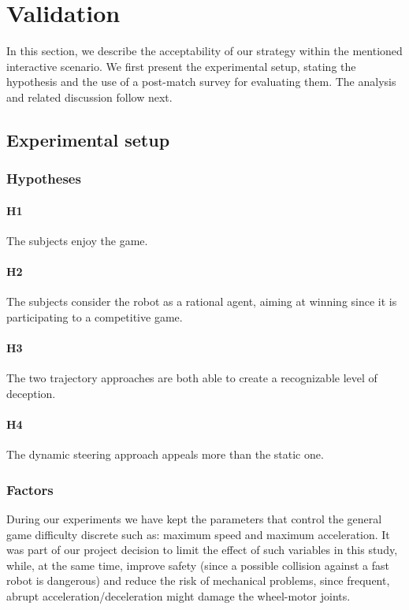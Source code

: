 
\section{Validation}
\label{sec:deception_validation}
In this section, we describe the acceptability of our strategy within the mentioned interactive scenario. We first present the experimental setup, stating the hypothesis and the use of a post-match survey for evaluating them. The analysis and related discussion follow next. 


\subsection{Experimental setup}
\subsubsection{Hypotheses}

\paragraph{H1} The subjects enjoy the game.
\paragraph{H2} The subjects consider the robot as a rational agent, aiming at winning since it is participating to a competitive game.
\paragraph{H3} The two trajectory approaches are both able to create a recognizable level of deception. 
\paragraph{H4} The dynamic steering approach appeals more than the static one.

\subsubsection{Factors}
During our experiments we have kept the parameters that control the general game difficulty discrete such as: maximum speed and maximum acceleration. It was part of our project decision to limit the effect of such variables in this study, while, at the same time, improve safety (since a possible collision against a fast robot is dangerous) and reduce the risk of mechanical problems, since frequent, abrupt acceleration/deceleration might damage the wheel-motor joints.


